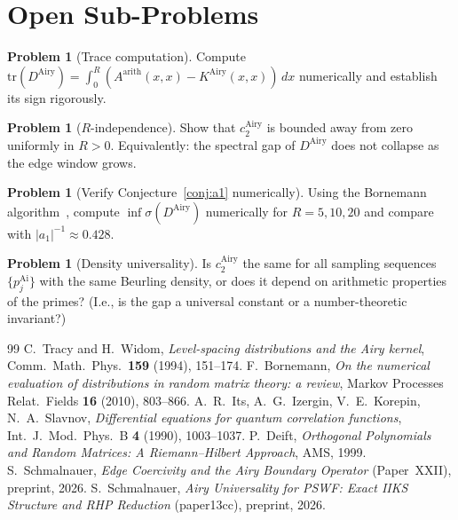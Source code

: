 \documentclass[12pt,a4paper]{amsart}
\theoremstyle{definition}
\newtheorem{problem}[theorem]{Problem}
\newcommand{\KAi}{K^{\mathrm{Airy}}}
\newcommand{\DAi}{D^{\mathrm{Airy}}}
\begin{document}
\section{Open Sub-Problems}
\label{sec:subproblems}

\begin{problem}[Trace computation]\label{sub1}
Compute $\mathrm{tr}(\DAi)
= \int_0^R (A^{\mathrm{arith}}(x,x) - \KAi(x,x))\,dx$
numerically and establish its sign rigorously.
\end{problem}

\begin{problem}[$R$-independence]\label{sub2}
Show that $c_2^{\mathrm{Airy}}$ is bounded away from zero
uniformly in $R > 0$.
Equivalently: the spectral gap of $\DAi$ does not
collapse as the edge window grows.
\end{problem}

\begin{problem}[Verify Conjecture~\ref{conj:a1} numerically]%
\label{sub3}
Using the Bornemann algorithm~\cite{Bornemann2010},
compute $\inf\sigma(\DAi)$ numerically for $R = 5, 10, 20$
and compare with $|a_1|^{-1} \approx 0.428$.
\end{problem}

\begin{problem}[Density universality]\label{sub4}
Is $c_2^{\mathrm{Airy}}$ the same for all sampling
sequences $\{p_j^{\mathrm{Ai}}\}$ with the same Beurling density,
or does it depend on arithmetic properties of the primes?
(I.e., is the gap a universal constant or a number-theoretic invariant?)
\end{problem}

\begin{thebibliography}{99}
C.~Tracy and H.~Widom,
\textit{Level-spacing distributions and the Airy kernel},
Comm.\ Math.\ Phys.\ \textbf{159} (1994), 151--174.
F.~Bornemann,
\textit{On the numerical evaluation of distributions in random
matrix theory: a review},
Markov Processes Relat.\ Fields \textbf{16} (2010), 803--866.
A.~R.~Its, A.~G.~Izergin, V.~E.~Korepin, N.~A.~Slavnov,
\textit{Differential equations for quantum correlation functions},
Int.\ J.\ Mod.\ Phys.\ B \textbf{4} (1990), 1003--1037.
P.~Deift, \textit{Orthogonal Polynomials and Random Matrices:
A Riemann--Hilbert Approach}, AMS, 1999.
S.~Schmalnauer,
\textit{Edge Coercivity and the Airy Boundary Operator}
(Paper~XXII), preprint, 2026.
S.~Schmalnauer,
\textit{Airy Universality for PSWF: Exact IIKS Structure
and RHP Reduction} (paper13cc), preprint, 2026.
\end{thebibliography}
\end{document}
